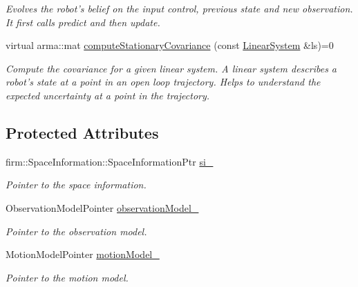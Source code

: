 \begin{DoxyCompactItemize}
\begin{DoxyCompactList}\small\item\em \-Evolves the robot's belief on the input control, previous state and new observation. \-It first calls predict and then update. \end{DoxyCompactList}\item 
\hypertarget{class_kalman_filter_method_a8f9d8ae8cf4e3bd0138d731bd2539441}{virtual arma\-::mat \hyperlink{class_kalman_filter_method_a8f9d8ae8cf4e3bd0138d731bd2539441}{compute\-Stationary\-Covariance} (const \hyperlink{class_linear_system}{\-Linear\-System} \&ls)=0}\label{class_kalman_filter_method_a8f9d8ae8cf4e3bd0138d731bd2539441}

\begin{DoxyCompactList}\small\item\em \-Compute the covariance for a given linear system. \-A linear system describes a robot's state at a point in an open loop trajectory. \-Helps to understand the expected uncertainty at a point in the trajectory. \end{DoxyCompactList}\end{DoxyCompactItemize}
\subsection*{\-Protected \-Attributes}
\begin{DoxyCompactItemize}
\item 
\hypertarget{class_kalman_filter_method_a9a2355339d83656f5db7c86a60d12822}{firm\-::\-Space\-Information\-::\-Space\-Information\-Ptr \hyperlink{class_kalman_filter_method_a9a2355339d83656f5db7c86a60d12822}{si\-\_\-}}\label{class_kalman_filter_method_a9a2355339d83656f5db7c86a60d12822}

\begin{DoxyCompactList}\small\item\em \-Pointer to the space information. \end{DoxyCompactList}\item 
\hypertarget{class_kalman_filter_method_a43191b745846715c66854634ba58e85c}{\-Observation\-Model\-Pointer \hyperlink{class_kalman_filter_method_a43191b745846715c66854634ba58e85c}{observation\-Model\-\_\-}}\label{class_kalman_filter_method_a43191b745846715c66854634ba58e85c}

\begin{DoxyCompactList}\small\item\em \-Pointer to the observation model. \end{DoxyCompactList}\item 
\hypertarget{class_kalman_filter_method_a5969ade2e4d4f70a1cccc2f2f2bf4bb3}{\-Motion\-Model\-Pointer \hyperlink{class_kalman_filter_method_a5969ade2e4d4f70a1cccc2f2f2bf4bb3}{motion\-Model\-\_\-}}\label{class_kalman_filter_method_a5969ade2e4d4f70a1cccc2f2f2bf4bb3}

\begin{DoxyCompactList}\small\item\em \-Pointer to the motion model. \end{DoxyCompactList}\end{DoxyCompactItemize}
